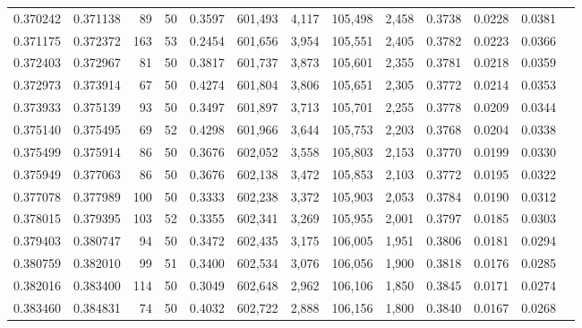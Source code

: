 \begin{tabular}{rrrrrrrrrrrrr}
0.370242 & 0.371138 &    89 &  50 &                                     0.3597 & 601,493 &   4,117 & 105,498 &   2,458 & 0.3738 & 0.0228 & 0.0381 \\
0.371175 & 0.372372 &   163 &  53 &                                     0.2454 & 601,656 &   3,954 & 105,551 &   2,405 & 0.3782 & 0.0223 & 0.0366 \\
0.372403 & 0.372967 &    81 &  50 &                                     0.3817 & 601,737 &   3,873 & 105,601 &   2,355 & 0.3781 & 0.0218 & 0.0359 \\
0.372973 & 0.373914 &    67 &  50 &                                     0.4274 & 601,804 &   3,806 & 105,651 &   2,305 & 0.3772 & 0.0214 & 0.0353 \\
0.373933 & 0.375139 &    93 &  50 &                                     0.3497 & 601,897 &   3,713 & 105,701 &   2,255 & 0.3778 & 0.0209 & 0.0344 \\
0.375140 & 0.375495 &    69 &  52 &                                     0.4298 & 601,966 &   3,644 & 105,753 &   2,203 & 0.3768 & 0.0204 & 0.0338 \\
0.375499 & 0.375914 &    86 &  50 &                                     0.3676 & 602,052 &   3,558 & 105,803 &   2,153 & 0.3770 & 0.0199 & 0.0330 \\
0.375949 & 0.377063 &    86 &  50 &                                     0.3676 & 602,138 &   3,472 & 105,853 &   2,103 & 0.3772 & 0.0195 & 0.0322 \\
0.377078 & 0.377989 &   100 &  50 &                                     0.3333 & 602,238 &   3,372 & 105,903 &   2,053 & 0.3784 & 0.0190 & 0.0312 \\
0.378015 & 0.379395 &   103 &  52 &                                     0.3355 & 602,341 &   3,269 & 105,955 &   2,001 & 0.3797 & 0.0185 & 0.0303 \\
0.379403 & 0.380747 &    94 &  50 &                                     0.3472 & 602,435 &   3,175 & 106,005 &   1,951 & 0.3806 & 0.0181 & 0.0294 \\
0.380759 & 0.382010 &    99 &  51 &                                     0.3400 & 602,534 &   3,076 & 106,056 &   1,900 & 0.3818 & 0.0176 & 0.0285 \\
0.382016 & 0.383400 &   114 &  50 &                                     0.3049 & 602,648 &   2,962 & 106,106 &   1,850 & 0.3845 & 0.0171 & 0.0274 \\
0.383460 & 0.384831 &    74 &  50 &                                     0.4032 & 602,722 &   2,888 & 106,156 &   1,800 & 0.3840 & 0.0167 & 0.0268 \\

\end{tabular}
